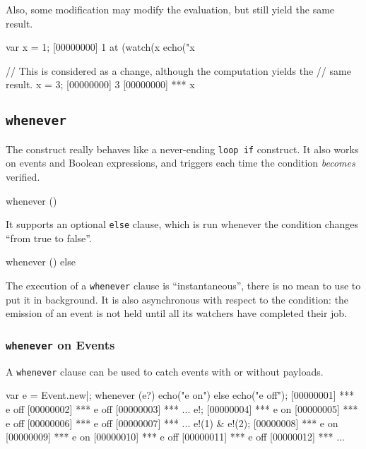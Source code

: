 Also, some modification may modify the evaluation, but still yield the same
result.

\begin{urbiscript}[firstnumber=1]
var x = 1;
[00000000] 1
at (watch(x %
  echo("x %

// This is considered as a change, although the computation yields the
// same result.
x = 3;
[00000000] 3
[00000000] *** x %
\end{urbiscript}


\subsection{\lstinline{whenever}}
\label{sec:lang:whenever}

The  construct really behaves like a never-ending
\lstinline|loop if| construct.  It also works on events and Boolean
expressions, and triggers each time the condition \emph{becomes} verified.

\begin{urbiunchecked}
whenever ()
\end{urbiunchecked}

It supports an optional \lstinline{else} clause, which is run whenever
the condition changes ``from true to false''.

\begin{urbiunchecked}
whenever ()
else
\end{urbiunchecked}

The execution of a \lstinline{whenever} clause is ``instantaneous'',
there is no mean to use \samp{,} to put it in background.  It is also
asynchronous with respect to the condition: the emission of an event
is not held until all its watchers have completed their job.

\subsubsection{\lstinline{whenever} on Events}

A \lstinline{whenever} clause can be used to catch events with or
without payloads.

\begin{urbiunchecked}[firstnumber=1]
var e = Event.new|;
whenever (e?)
  echo("e on")
else
  echo("e off");
[00000001] *** e off
[00000002] *** e off
[00000003] *** ...
e!;
[00000004] *** e on
[00000005] *** e off
[00000006] *** e off
[00000007] *** ...
e!(1) & e!(2);
[00000008] *** e on
[00000009] *** e on
[00000010] *** e off
[00000011] *** e off
[00000012] *** ...
\end{urbiunchecked}

